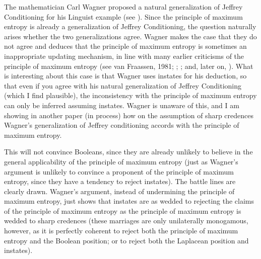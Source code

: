 \documentclass[11pt]{article}
\begin{document}

The mathematician Carl Wagner proposed a natural generalization of
Jeffrey Conditioning for his Linguist example (see
). Since the principle of maximum entropy is
already a generalization of Jeffrey Conditioning, the question
naturally arises whether the two generalizations agree. Wagner makes
the case that they do not agree and deduces that the principle of
maximum entropy is sometimes an inappropriate updating mechanism, in
line with many earlier criticisms of the principle of maximum entropy
(see van Fraassen, 1981;
; ; and, later on,
). What is interesting about this case is
that Wagner uses instates for his deduction, so that even if you agree
with his natural generalization of Jeffrey Conditioning (which I find
plausible), the inconsistency with the principle of maximum entropy
can only be inferred assuming instates. Wagner is unaware of this, and
I am showing in another paper (in process) how on the assumption of
sharp credences Wagner's generalization of Jeffrey conditioning
accords with the principle of maximum entropy.

This will not convince Booleans, since they are already unlikely to
believe in the general applicability of the principle of maximum
entropy (just as Wagner's argument is unlikely to convince a proponent
of the principle of maximum entropy, since they have a tendency to
reject instates). The battle lines are clearly drawn. Wagner's
argument, instead of undermining the principle of maximum entropy,
just shows that instates are as wedded to rejecting the claims of the
principle of maximum entropy as the principle of maximum entropy is
wedded to sharp credences (these marriages are only unilaterally
monogamous, however, as it is perfectly coherent to reject both the
principle of maximum entropy and the Boolean position; or to reject
both the Laplacean position and instates). 
\end{document}
